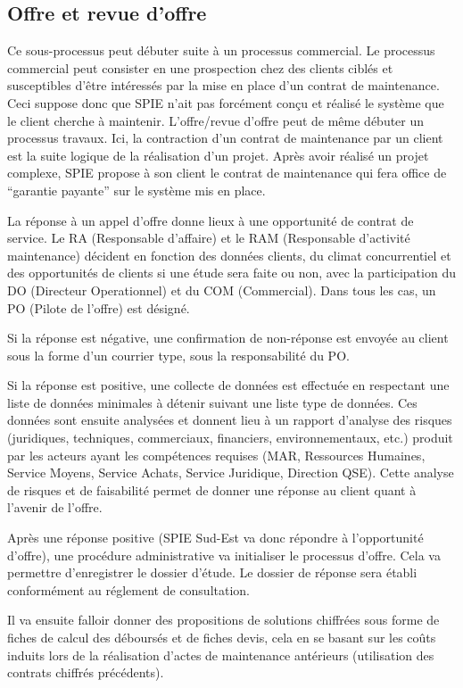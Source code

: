 \subsection{Offre et revue d’offre}

Ce sous-processus peut débuter suite à un processus commercial. Le processus commercial peut consister en une prospection chez des clients ciblés et susceptibles d’être intéressés par la mise en place d’un contrat de maintenance. Ceci suppose donc que SPIE n’ait pas forcément conçu et réalisé le système que le client cherche à maintenir. L’offre/revue d’offre peut de même débuter un processus travaux. Ici, la contraction d’un contrat de maintenance par un client est la suite logique de la réalisation d’un projet. Après avoir réalisé un projet complexe, SPIE propose à son client le contrat de maintenance qui fera office de “garantie payante” sur le système mis en place.

La réponse à un appel d’offre donne lieux à une opportunité de contrat de service. Le RA (Responsable d’affaire) et le RAM (Responsable d’activité maintenance) décident en fonction des données clients, du climat concurrentiel et des opportunités de clients si une étude sera faite ou non, avec la participation du DO (Directeur Operationnel) et du COM (Commercial). Dans tous les cas, un PO (Pilote de l’offre) est désigné.

Si la réponse est négative, une confirmation de non-réponse est envoyée au client sous la forme d’un courrier type, sous la responsabilité du PO.

Si la réponse est positive, une collecte de données est effectuée en respectant une liste de données minimales à détenir suivant une liste type de données. Ces données sont ensuite analysées et donnent lieu à un rapport d’analyse des risques (juridiques, techniques, commerciaux, financiers, environnementaux, etc.) produit par les acteurs ayant les compétences requises (MAR, Ressources Humaines, Service Moyens, Service Achats, Service Juridique, Direction QSE). Cette analyse de risques et de faisabilité permet de donner une réponse au client quant à l'avenir de l’offre.

Après une réponse positive (SPIE Sud-Est va donc répondre à l’opportunité d’offre), une procédure administrative va initialiser le processus d'offre. Cela va permettre d'enregistrer le dossier d'étude. Le dossier de réponse sera établi conformément au réglement de consultation.

Il va ensuite falloir donner des propositions de solutions chiffrées sous forme de fiches de calcul des déboursés et de fiches devis, cela en se basant sur les coûts induits lors de la réalisation d'actes de maintenance antérieurs (utilisation des contrats chiffrés précédents).

